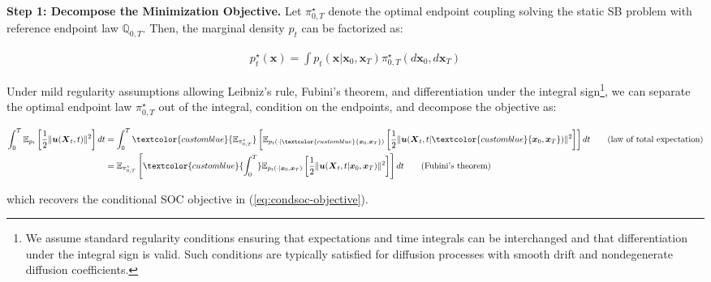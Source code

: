 \documentclass{article}
\newcommand{\bluetext}[1]{\textcolor{customblue}{#1}}
\begin{document}
\textbf{Step 1: Decompose the Minimization Objective. }
Let $\pi^\star_{0,T}$ denote the optimal endpoint coupling solving the static SB problem with reference endpoint law $\mathbb{Q}_{0,T}$. Then, the marginal density $p_t$ can be factorized as:
\begin{small}
\begin{align}
    p^\star_t(\boldsymbol{x})=\int p_t(\boldsymbol{x}|\boldsymbol{x}_0, \boldsymbol{x}_T)\pi^\star_{0,T}(d\boldsymbol{x}_0, d\boldsymbol{x}_T)\label{eq:condsoc-proof1}
\end{align}
\end{small}
Under mild regularity assumptions allowing Leibniz's rule, Fubini's theorem, and differentiation under the integral sign\footnote{We assume standard regularity conditions ensuring that expectations and time integrals can be interchanged and that differentiation under the integral sign is valid. Such conditions are typically satisfied for diffusion processes with smooth drift and nondegenerate diffusion coefficients.}, we can separate the optimal endpoint law $\pi^\star_{0,T}$ out of the integral, condition on the endpoints, and decompose the objective as:
\begin{small}
\begin{align}
    \int_0^T\mathbb{E}_{p_t}\left[\frac{1}{2}\|\boldsymbol{u}(\boldsymbol{X}_t,t)\|^2 \right]dt&=\int_0^T\bluetext{\mathbb{E}_{\pi^\star_{0,T}}}\left[\mathbb{E}_{p_t(\cdot|\bluetext{\boldsymbol{x}_0, \boldsymbol{x}_T})}\left[\frac{1}{2}\|\boldsymbol{u}(\boldsymbol{X}_t,t|\bluetext{\boldsymbol{x}_0, \boldsymbol{x}_T})\|^2 \right]\right]dt\tag{law of total expectation}\\
    &=\mathbb{E}_{\pi^\star_{0,T}}\left[\bluetext{\int_0^T}\mathbb{E}_{p_t(\cdot|\boldsymbol{x}_0, \boldsymbol{x}_T)}\left[\frac{1}{2}\|\boldsymbol{u}(\boldsymbol{X}_t,t|\boldsymbol{x}_0, \boldsymbol{x}_T)\|^2 \right]\right]dt\tag{Fubini's theorem}
\end{align}
\end{small}
which recovers the conditional SOC objective in (\ref{eq:condsoc-objective}).
\end{document}
